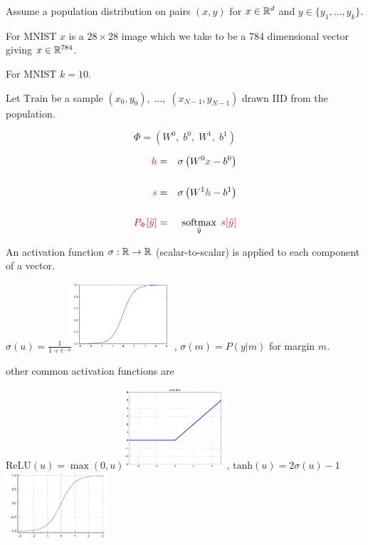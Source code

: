 {

Assume a population distribution on pairs $(x,y)$ for $x \in \mathbb{R}^d$ and $y \in \{y_1,\ldots, y_k\}$.

\vfill
For MNIST $x$ is a $28 \times 28$ image which we take to be a 784 dimensional vector giving $x \in \mathbb{R}^{784}$.

\vfill
For MNIST $k = 10$.

\vfill
Let $\mathrm{Train}$ be a sample $(x_0,y_0),\;\ldots,\;(x_{N-1},y_{N-1})$ drawn IID from the population.


$$\Phi = (W^0,\;b^0,\;W^1,\;b^1)$$

\begin{eqnarray*}
  {\color{red} h} & = & \sigma\left(W^0{\color{red} x} - b^0\right) \\
  \\
  {\color{red} s} & = & \sigma\left(W^1{\color{red} h} - b^1 \right) \\
  \\
  {\color{red} P_\Phi[\hat{y}]} & = & \operatorname*{softmax}_{\hat{y}}\;{\color{red} s[\hat{y}]}
\end{eqnarray*}


An activation function $\sigma:\mathbb{R} \rightarrow \mathbb{R}$ (scalar-to-scalar) is applied to each component of a vector.

\vfill
\centerline{{\color{red} $\sigma(u) = \frac{1}{1+e^{-u}}$}\hspace{3em}\includegraphics[width=1.5in]{../images/sigmoid}, {\color{red} $\sigma(m) = P(y|m)$ for margin $m$}.}

\vfill
other common activation functions are

\vfill
\centerline{{\color{red} $\mathrm{ReLU}(u) = \max(0,u)$}\includegraphics[width=1.5in]{../images/relu},
{\color{red} $\mathrm{tanh}(u) = 2\sigma(u)-1$}\includegraphics[width=1.5in]{../images/tanh}}

}
